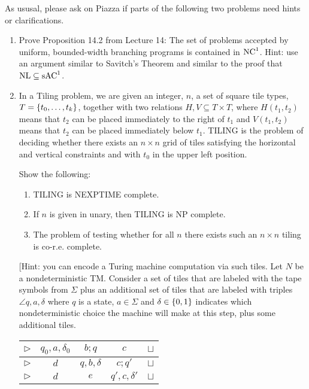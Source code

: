 \documentclass[12pt]{article}
\begin{document}
\thispagestyle{empty}
\noindent{}
\addtocounter{section}{9}

As ususal, please ask on Piazza if parts of the following two problems need hints or clarifications.

\begin{enumerate}

\item Prove Proposition 14.2 from Lecture 14:  The set of problems accepted by uniform, bounded-width branching
  programs is contained in  $\mbox{{\rm NC}}^1$.  Hint: use an argument similar to Savitch's Theorem and similar
  to the proof that $\mbox{{\rm NL}} \subseteq \mbox{{\rm sAC}}^1$.

\item  %
In a Tiling problem, we are
given an integer, $n$, a set of square tile types, $T = \{ t_0, \ldots, t_k \}$, together with two
relations $H,V 
\subseteq T \times T$, where $H(t_1,t_2)$ means that $t_2$ can be placed immediately to the right of
$t_1$ and $V(t_1,t_2)$ means that $t_2$ can be placed immediately below $t_1$.  TILING is the
problem of deciding whether there exists an $n\times n$ grid of tiles satisfying the horizontal and
vertical constraints and with $t_0$ in the upper left position.

Show the following:

\begin{enumerate}
\item TILING is NEXPTIME complete.
\item If $n$ is given in unary, then TILING is NP complete.
\item The problem of testing whether for all $n$ there exists such an $n\times n$ tiling is
  co-r.e. complete.  
\end{enumerate}


[Hint: you can encode a Turing machine computation via such tiles.  Let $N$
be a nondeterministic TM.  Consider a set of tiles that are labeled with
the tape symbols from $\Sigma$ plus an additional set of tiles that are
labeled with triples $\angle{q,a,\delta}$ where $q$ is a state, $a\in
\Sigma$ and $\delta\in\{ 0,1 \}$ indicates which nondeterministic choice
the machine will make at this step, plus some additional tiles.  


\begin{center}
\begin{tabular}{|c|c|c|c|c|}\hline
$\triangleright$ & $q_0,a,\delta_0$ & $b;q$ & $c$ & $\sqcup$\\ \hline
$\triangleright$ & $d$ & $q,b,\delta$ & $c;q'$ & $\sqcup$\\ \hline
$\triangleright$ & $d$ & $e$ & $q',c,\delta'$ & $\sqcup$\\ \hline
\end{tabular}
\end{center}


\end{enumerate}
\end{document}
